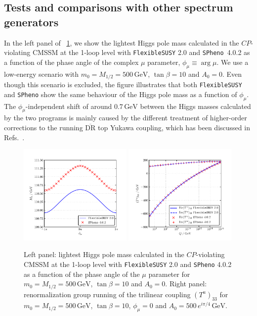 \documentclass[final,3p,11pt,pdflatex]{elsarticle}
\makeatletter
\newcommand{\spheno}{\texttt{SPheno}\@\xspace}
\newcommand{\fs}{\texttt{FlexibleSUSY}\@\xspace}
\newcommand{\fstwo}{\fs 2.0\@\xspace}
\newcommand{\ol}[1]{\overline{#1}}
\newcommand{\DRbar}{\ensuremath{\ol{\text{DR}}}\xspace}
\newcommand{\unit}[1]{\,\text{#1}}      %
\newcommand{\figref}[1]{\figurename~\ref{#1}}
\newcommand{\CP}{\ensuremath{CP}\xspace}
\newcommand{\azero}{\ensuremath{A_0}\xspace}
\newcommand{\mhalf}{\ensuremath{M_{1/2}}\xspace}
\newcommand{\mzero}{\ensuremath{m_0}\xspace}
\makeatother
\begin{document}
\subsection{Tests and comparisons with other spectrum generators}
%
In the left panel of \figref{fig:CMSSMCPV_plots}, we show the lightest
Higgs pole mass calculated in the \CP-violating CMSSM at the 1-loop
level with \fstwo and \spheno~4.0.2 as a function of the phase angle
of the complex $\mu$ parameter, $\phi_\mu \equiv \arg \mu$.
We use a low-energy scenario with $\mzero = \mhalf = 500\unit{GeV}$,
$\tan\beta = 10$ and $\azero = 0$.  Even though this scenario is
excluded, the figure illustrates that both \fs and \spheno show the
same behaviour of the Higgs pole mass as a function of $\phi_\mu$.
The $\phi_\mu$-independent shift of around $0.7\unit{GeV}$ between the
Higgs masses calculated by the two programs is mainly caused by the
different treatment of higher-order corrections to
the running \DRbar top Yukawa coupling, which has been discussed in
Refs.~\cite{Staub:2015aea,ThomasKwasnitza:2016yqj}.
%
\begin{figure}[tbh]
  \centering
  \includegraphics[width=0.49\textwidth]{doc/plots/CMSSMCPV/scan_Mh_PhiMu_m0-500_M12-500_TB-10_A0-0}\hfill
  \includegraphics[width=0.49\textwidth]{doc/plots/CMSSMCPV/scan_TYu33_Q_m0-500_M12-500_TB-10_A0-500_PhiMu-0_PhiA0-Pi4}
  \caption{Left panel: lightest Higgs pole mass calculated in the
    \CP-violating CMSSM at the 1-loop level with \fstwo and
    \spheno 4.0.2 as a function of the phase angle of the $\mu$
    parameter for $\mzero = \mhalf = 500\unit{GeV}$, $\tan\beta = 10$
    and $\azero = 0$.  Right panel: renormalization group running of the
    trilinear coupling $(T^u)_{33}$ for $\mzero = \mhalf =
    500\unit{GeV}$, $\tan\beta = 10$, $\phi_\mu = 0$ and $\azero = 500\,
    e^{i \pi/4} \unit{GeV}$.}
  \label{fig:CMSSMCPV_plots}
\end{figure}
\end{document}
